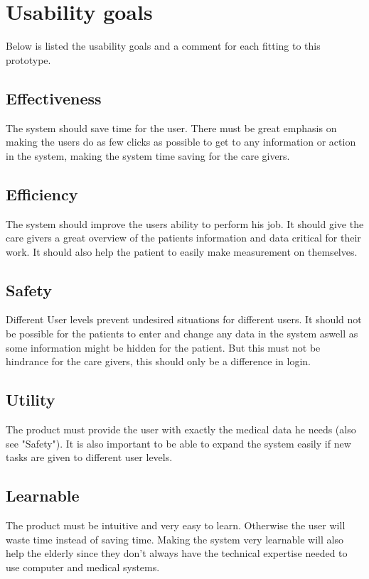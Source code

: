 \section{Usability goals}
Below is listed the usability goals and a comment for each fitting to this prototype.
\subsection{Effectiveness}
The system should save time for the user. There must be great emphasis on making the users do as few clicks as possible to get to any information or action in the system, making the system time saving for the care givers.

\subsection{Efficiency}
The system should improve the users ability to perform his job. It should give the care givers a great overview of the patients information and data critical for their work. It should also help the patient to easily make measurement on themselves.

\subsection{Safety}
Different User levels prevent undesired situations for different users. It should not be possible for the patients to enter and change any data in the system aswell as some information might be hidden for the patient. But this must not be hindrance for the care givers, this should only be a difference in login.

\subsection{Utility}
The product must provide the user with exactly the medical data he needs (also see "Safety"). It is also important to be able to expand the system easily if new tasks are given to different user levels.

\subsection{Learnable}
The product must be intuitive and very easy to learn. Otherwise the user will waste time instead of saving time. Making the system very learnable will also help the elderly since they don't always have the technical expertise needed to use computer and medical systems.

